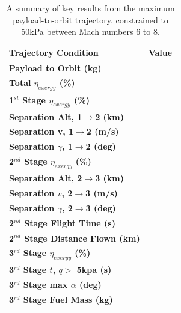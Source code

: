 	\begin{table}[ht]
	\centering
\begin{tabular}{l c } 
	\hline \textbf{Trajectory Condition}
	& Value

	\\
	\hline \textbf{Payload to Orbit (kg)}
	& \textbf{\PayloadToOrbitqconstrainedNoReturn}
	\\
	\textbf{Total $\eta_{exergy}$ (\%)}
	& \textbf{\totalExergyEffqconstrainedNoReturn}
	\\
	\hline 
	\textbf{1$^{st}$ Stage $\eta_{exergy}$ (\%)}
	& \textbf{\firstExergyEffqconstrainedNoReturn}
	\\
	\textbf{Separation Alt, 1$\rightarrow$2 (km)}
	& \firstsecondSeparationAltqconstrainedNoReturn
	\\
	\textbf{Separation v, 1$\rightarrow$2 (m/s)}
	& \firstsecondSeparationvqconstrainedNoReturn
	\\
	\textbf{Separation $\gamma$, 1$\rightarrow$2 (deg)}
	& \firstsecondSeparationgammaqconstrainedNoReturn
	\\
	\hline 
	\textbf{2$^{nd}$ Stage $\eta_{exergy}$ (\%)}
	& \textbf{\secondExergyEffqconstrainedNoReturn}
	\\
	\textbf{Separation Alt, 2$\rightarrow$3 (km)}
	& \secondthirdSeparationAltqconstrainedNoReturn
	\\
	\textbf{Separation $v$, 2$\rightarrow$3 (m/s)}
	& \secondthirdSeparationvqconstrainedNoReturn
	\\
	\textbf{Separation $\gamma$, 2$\rightarrow$3 (deg)}
	& \secondthirdSeparationgammaqconstrainedNoReturn
	\\
	\textbf{2$^{nd}$ Stage Flight Time (s)}
	& \secondFlightTimeqconstrainedNoReturn
	\\
	\textbf{2$^{nd}$ Stage Distance Flown (km)}
	& \SecondDistqconstrainedNoReturn
	\\
	\hline 
	\textbf{3$^{rd}$ Stage $\eta_{exergy}$ (\%)}
	& \textbf{\thirddExergyEffqconstrainedNoReturn}
	\\
	\textbf{3$^{rd}$ Stage $t$, $q >$ 5kpa (s)}
	& \thirdqOverFiveqconstrainedNoReturn
	\\
	\textbf{3$^{rd}$ Stage max $\alpha$ (deg)}
	& \thirdmaxAoAqconstrainedNoReturn
	\\
	\textbf{3$^{rd}$ Stage Fuel Mass (kg)}
	& \thirdmFuelqconstrainedNoReturn
	\\
	\hline 
\end{tabular} 
\caption{A summary of key results from the maximum payload-to-orbit trajectory, constrained to 50kPa between Mach numbers 6 to 8.}
\label{tab:constrained68}

	\end{table}
		
